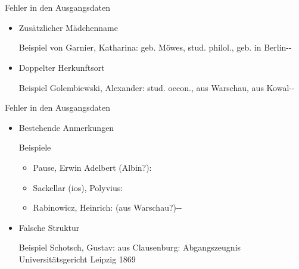 \documentclass[12pt]{beamer}
\begin{document}
\begin{large}
 \subsection*{~}

\begin{frame}{Fehler in den Ausgangsdaten}
 \begin{itemize}
  \item Zusätzlicher Mädchenname
  \begin{block}{Beispiel}
   \normalsize
   von Garnier, Katharina: geb. Möwes, stud. philol., geb. in Berlin-{}-
  \end{block}
  
  \vspace*{\fill}

  \item Doppelter Herkunftsort
  \begin{block}{Beispiel}
   \normalsize
   Golembiewski, Alexander: stud. oecon., aus Warschau, aus Kowal-{}-
  \end{block}

 \end{itemize}
\end{frame}


\begin{frame}{Fehler in den Ausgangsdaten}
 \begin{itemize}
  \item Bestehende Anmerkungen  
  \begin{block}{Beispiele}
   \begin{itemize}
    \normalsize
    \item Pause, Erwin Adelbert (Albin?):
    \vspace*{-0.25cm}
    \item Sackellar (ios), Polyvius:
    \vspace*{-0.25cm}
    \item Rabinowicz, Heinrich: (aus Warschau?)-{}-
   \end{itemize}      
  \end{block}

  \vspace*{\fill}  
  
  \item Falsche Struktur
  \begin{block}{Beispiel}
   \normalsize   
   Schotsch, Gustav: aus Clausenburg: Abgangszeugnis Universitätsgericht Leipzig 1869
  \end{block}
  
 \end{itemize}
\end{frame}



\end{large}
\end{document}
